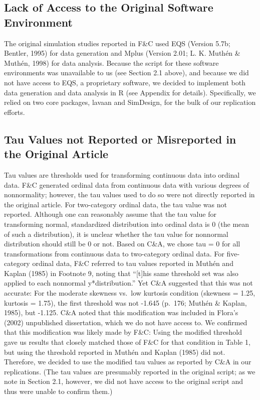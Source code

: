\documentclass[10,a4paperpaper,]{article}
\begin{document}
\subsection{Lack of Access to the Original Software Environment}

The original simulation studies reported in F\&C used EQS (Version 5.7b;
Bentler, 1995) for data generation and Mplus (Version 2.01; L. K. Muthén
\& Muthén, 1998) for data analysis. Because the script for these
software environments was unavailable to us (see Section 2.1 above), and
because we did not have access to EQS, a proprietary software, we
decided to implement both data generation and data analysis in R (see
Appendix for details). Specifically, we relied on two core packages,
lavaan and SimDesign, for the bulk of our replication efforts.

\subsection{Tau Values not Reported or Misreported in the Original Article}

Tau values are thresholds used for transforming continuous data into
ordinal data. F\&C generated ordinal data from continuous data with
various degrees of nonnormality; however, the tau values used to do so
were not directly reported in the original article. For two-category
ordinal data, the tau value was not reported. Although one can
reasonably assume that the tau value for transforming normal,
standardized distribution into ordinal data is 0 (the mean of such a
distribution), it is unclear whether the tau value for nonnormal
distribution should still be 0 or not. Based on C\&A, we chose tau = 0
for all transformations from continuous data to two-category ordinal
data. For five-category ordinal data, F\&C referred to tau values
reported in Muthén and Kaplan (1985) in Footnote 9, noting that
``{[}t{]}his same threshold set was also applied to each nonnormal
y*distribution.'' Yet C\&A suggested that this was not accurate: For the
moderate skewness vs.~low kurtosis condition (skewness = 1.25, kurtosis
= 1.75), the first threshold was not -1.645 (p.~176; Muthén \& Kaplan,
1985), but -1.125. C\&A noted that this modification was included in
Flora's (2002) unpublished dissertation, which we do not have access to.
We confirmed that this modification was likely made by F\&C: Using the
modified threshold gave us results that closely matched those of F\&C
for that condition in Table 1, but using the threshold reported in
Muthén and Kaplan (1985) did not. Therefore, we decided to use the
modified tau values as reported by C\&A in our replications. (The tau
values are presumably reported in the original script; as we note in
Section 2.1, however, we did not have access to the original script and
thus were unable to confirm them.)
\end{document}
